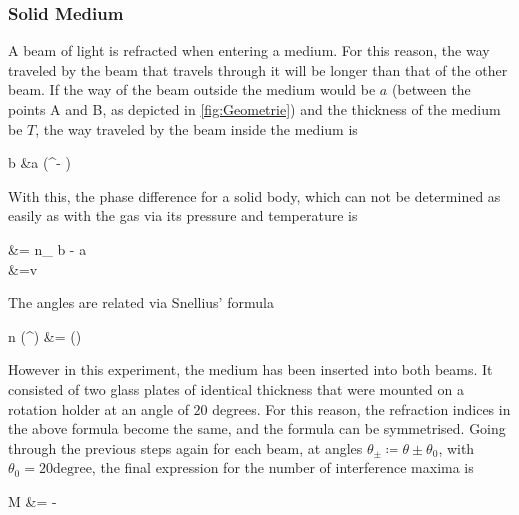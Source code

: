 \subsubsection{Solid Medium}
A beam of light is refracted when entering a medium. For this reason, the way traveled by the beam that travels through it will be longer than that of the other beam. If the way of the beam outside the medium would be $a$ (between the points A and B, as depicted in \autoref{fig:Geometrie}) and the thickness of the medium be $T$, the way traveled by the beam inside the medium is 
\begin{aquation}
  b &\coloneqq a \cos(\theta^\prime - \theta) \tp
\end{aquation}
With this, the phase difference for a solid body, which can not be determined as easily as with the gas via its pressure and temperature is
\begin{aquation}
\label{eq:phase-difference_solid}
  \Delta \varphi &=  \lbr n_ b - a \rbr \\
  		&=v  \lbr {}\rbr \tp
\end{aquation}
The angles are related via Snellius' formula
\begin{aquation}
  n \sin(\theta^\prime) &= \sin(\theta) \tp
\end{aquation}
However in this experiment, the medium has been inserted into both beams. It consisted of two glass plates of identical thickness that were mounted on a rotation holder at an angle of $20$ degrees. For this reason, the refraction indices in the above formula become the same, and the formula can be symmetrised. Going through the previous steps again for each beam, at angles $\theta_\pm \coloneqq \theta \pm \theta_0$, with $\theta_0 = 20 \text{degree}$, the final expression for the number of interference maxima is 
\begin{aquation}
  M &=  \lbr {} - \rbr
\end{aquation}



